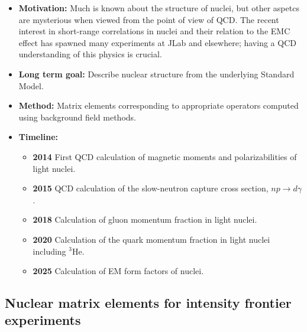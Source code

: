 \documentclass[12pt,hyperpdf]{article}
\begin{document}
\begin{itemize}  
    \item{\bf Motivation:} Much is known about the structure of nuclei, but other aspetcs are mysterious when viewed from the point of view of QCD. The recent interest in short-range correlations in nuclei and their relation to the EMC effect has spawned many experiments at JLab and elsewhere; having a QCD understanding of this physics is crucial. 
    
    \item{\bf Long term goal:} Describe nuclear structure from the underlying Standard Model. 
    
    \item{\bf Method:} Matrix elements corresponding to appropriate operators computed using background field methods.
      
\item{\bf Timeline:}
\begin{itemize}
    \item{\bf 2014} First QCD calculation of magnetic moments and polarizabilities of light nuclei.
    \item{\bf 2015} QCD calculation of the slow-neutron capture cross section, $np\to d\gamma$.
\item{\bf 2018} Calculation of gluon momentum fraction in light nuclei.
    \item{\bf 2020} Calculation of the quark momentum fraction in light nuclei including $^3$He. 
    \item{\bf 2025} Calculation of EM form factors of nuclei.
\end{itemize}
\end{itemize}

\subsection{Nuclear matrix elements for intensity frontier experiments}
\end{document}
